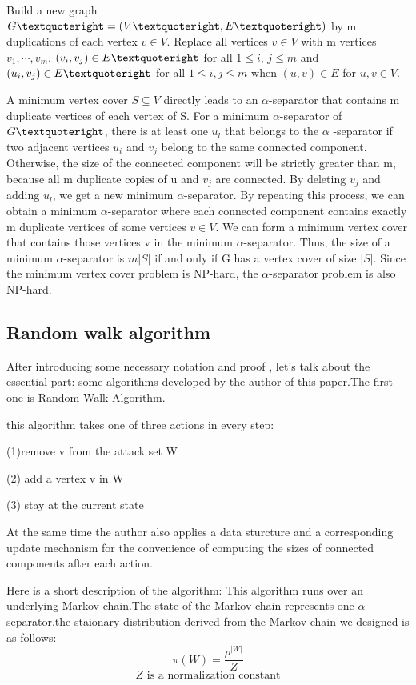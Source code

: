 \documentclass[10pt,journal]{IEEEtran}
\begin{document}
Build a new graph $G\textquoteright= (V\textquoteright, E \textquoteright)$ by m
duplications of each vertex $v\in V$. Replace all vertices $v\in V$ with m
vertices $v_1,\cdots,v_m $.  $(v_i, v_j) \in E \textquoteright $ for all $1 \leq i$, $j\leq m$ and $(u_i, v_j) \in E \textquoteright$ for all
$1 \leq i, j \leq m$ when $(u, v) \in E$ for  $u,v \in V$. 

A minimum vertex cover $S\subseteq V$
directly leads to an $\alpha$-separator that contains m duplicate vertices of
each vertex of S. For a minimum $\alpha$-separator of $G\textquoteright$, there is at
least one $u_l$ that belongs to the $\alpha$ -separator if two adjacent
vertices $u_i$ and $v_j$ belong to the same connected component. Otherwise, the size of the
connected component will be strictly greater than m, because all m
duplicate copies of u and $v_j$ are connected. By deleting $v_j$ and adding $u_l$,
we get a new minimum $\alpha$-separator. By repeating this process, we can
obtain a minimum $\alpha$-separator where each connected component
contains exactly m duplicate vertices of some vertices $v\in V$. We can
form a minimum vertex cover that contains those vertices v in the
minimum $\alpha$-separator. Thus, the size of a minimum $\alpha$-separator is $m|S|$
if and only if G has a vertex cover of size $|S|$. Since the minimum vertex
cover problem is NP-hard, the $\alpha$-separator problem is also NP-hard. 

\subsection{Random walk algorithm}


After introducing some necessary notation and proof , let's talk about the essential part: some algorithms developed by the author of this paper.The first one is Random Walk Algorithm.


this algorithm takes one of three actions in every step:

(1)remove v from the attack set W 

(2) add a vertex v in W

(3) stay at the current state

At the same time the author also applies a data sturcture and a corresponding update mechanism for the convenience of computing the sizes of connected components after each action.


Here is a short description of the algorithm:
This algorithm runs over an underlying Markov chain.The state of the Markov chain represents one $\alpha$-separator.the staionary distribution derived from the Markov chain we designed is as follows:
$$ \pi(W) = \frac{\rho^{|W|}}{Z}$$
$$Z \mbox{ is a normalization constant}$$
\end{document}
